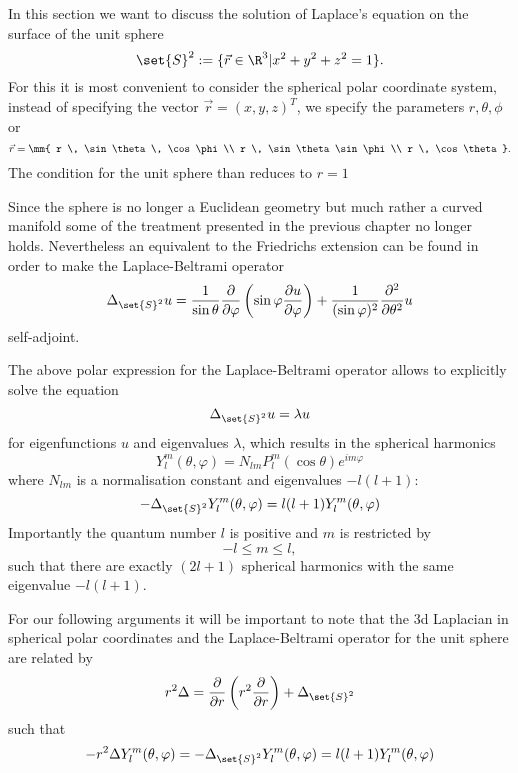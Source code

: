 In this section we want to discuss the solution of Laplace's equation
on the surface of the unit sphere
\[
	\set{S}^2 := \{ \vec{r} \in \R^3 | x^2 + y^2 + z^2 = 1 \}.
\]
For this it is most convenient to consider
the spherical polar coordinate system,
\ie instead of specifying the vector $\vec{r} = (x, y, z)^T$,
we specify the parameters $r, \theta, \phi$ or
\[ \vec{r} = \mm{ r \, \sin \theta \, \cos \phi \\ r \, \sin \theta \sin \phi \\
r \, \cos \theta }. \]
The condition for the unit sphere than reduces to $r=1$

Since the sphere is no longer a Euclidean geometry
but much rather a curved manifold some of the treatment presented
in the previous chapter no longer holds.
Nevertheless an equivalent to the Friedrichs extension can be found
in order to make the Laplace-Beltrami operator
\[ \Delta_{\set{S}^2} u = \frac{1}{\sin \theta} \frac{\partial}{\partial \varphi}
\left( \sin \varphi \frac{\partial u}{\partial \varphi}  \right)
+ \frac{1}{(\sin \varphi)^2} \frac{\partial^2}{\partial \theta^2} u\]
self-adjoint.

The above polar expression for the Laplace-Beltrami operator
allows to explicitly solve the equation
\newcommand{\laplaceSphere}{\Delta_{\set{S}^2}}
\[ \laplaceSphere u = \lambda u \]
for eigenfunctions $u$ and eigenvalues $\lambda$,
which results in the spherical harmonics
\[ Y_l^m(\theta, \varphi) = N_{lm} P_l^m(\cos \theta) e^{im\varphi} \]
where $N_{lm}$ is a normalisation constant
and eigenvalues $-l (l+1)$:
\begin{equation}
	-\laplaceSphere Y_l^m(\theta, \varphi) = l (l+1) Y_l^m(\theta, \varphi)
	\label{eqn:Laplace}
\end{equation}
Importantly the quantum number $l$ is positive and $m$ is restricted by
\[ -l \le m \le l, \]
such that there are exactly $(2l+1)$ spherical harmonics with the same eigenvalue
$-l (l+1)$.

For our following arguments it will be important to note
that the 3d Laplacian in spherical polar coordinates
and the Laplace-Beltrami operator for the unit sphere
are related by
\newcommand{\laplaceRadial}{\frac{\partial}{\partial r} \left( r^2 \frac{\partial}{\partial r} \right)}
\begin{equation}
r^2 \Delta = \laplaceRadial + \laplaceSphere
	\label{eqn:LaplaceCorrespondance}
\end{equation}
such that
\begin{equation}
	- r^2 \Delta Y_l^m(\theta, \varphi) = -\laplaceSphere Y_l^m(\theta, \varphi) = l (l+1) Y_l^m(\theta, \varphi)
	\label{eqn:LaplaceSphericalHarmonic}
\end{equation}


